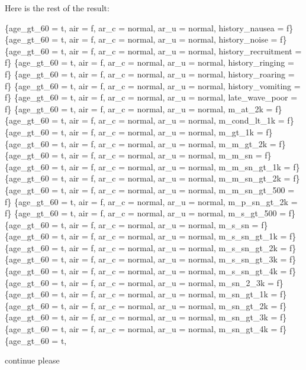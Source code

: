 \documentclass[12pt]{article}
\begin{document}
\begin{mdframed}
Here is the rest of the result:
\newline

    \{age\_gt\_60 = t, air = f, ar\_c = normal, ar\_u = normal, history\_nausea = f\}
    \{age\_gt\_60 = t, air = f, ar\_c = normal, ar\_u = normal, history\_noise = f\}
    \{age\_gt\_60 = t, air = f, ar\_c = normal, ar\_u = normal, history\_recruitment = f\}
    \{age\_gt\_60 = t, air = f, ar\_c = normal, ar\_u = normal, history\_ringing = f\}
    \{age\_gt\_60 = t, air = f, ar\_c = normal, ar\_u = normal, history\_roaring = f\}
    \{age\_gt\_60 = t, air = f, ar\_c = normal, ar\_u = normal, history\_vomiting = f\}
    \{age\_gt\_60 = t, air = f, ar\_c = normal, ar\_u = normal, late\_wave\_poor = f\}
    \{age\_gt\_60 = t, air = f, ar\_c = normal, ar\_u = normal, m\_at\_2k = f\}
    \{age\_gt\_60 = t, air = f, ar\_c = normal, ar\_u = normal, m\_cond\_lt\_1k = f\}
    \{age\_gt\_60 = t, air = f, ar\_c = normal, ar\_u = normal, m\_gt\_1k = f\}
    \{age\_gt\_60 = t, air = f, ar\_c = normal, ar\_u = normal, m\_m\_gt\_2k = f\}
    \{age\_gt\_60 = t, air = f, ar\_c = normal, ar\_u = normal, m\_m\_sn = f\}
    \{age\_gt\_60 = t, air = f, ar\_c = normal, ar\_u = normal, m\_m\_sn\_gt\_1k = f\}
    \{age\_gt\_60 = t, air = f, ar\_c = normal, ar\_u = normal, m\_m\_sn\_gt\_2k = f\}
    \{age\_gt\_60 = t, air = f, ar\_c = normal, ar\_u = normal, m\_m\_sn\_gt\_500 = f\}
    \{age\_gt\_60 = t, air = f, ar\_c = normal, ar\_u = normal, m\_p\_sn\_gt\_2k = f\}
    \{age\_gt\_60 = t, air = f, ar\_c = normal, ar\_u = normal, m\_s\_gt\_500 = f\}
    \{age\_gt\_60 = t, air = f, ar\_c = normal, ar\_u = normal, m\_s\_sn = f\}
    \{age\_gt\_60 = t, air = f, ar\_c = normal, ar\_u = normal, m\_s\_sn\_gt\_1k = f\}
    \{age\_gt\_60 = t, air = f, ar\_c = normal, ar\_u = normal, m\_s\_sn\_gt\_2k = f\}
    \{age\_gt\_60 = t, air = f, ar\_c = normal, ar\_u = normal, m\_s\_sn\_gt\_3k = f\}
    \{age\_gt\_60 = t, air = f, ar\_c = normal, ar\_u = normal, m\_s\_sn\_gt\_4k = f\}
    \{age\_gt\_60 = t, air = f, ar\_c = normal, ar\_u = normal, m\_sn\_2\_3k = f\}
    \{age\_gt\_60 = t, air = f, ar\_c = normal, ar\_u = normal, m\_sn\_gt\_1k = f\}
    \{age\_gt\_60 = t, air = f, ar\_c = normal, ar\_u = normal, m\_sn\_gt\_2k = f\}
    \{age\_gt\_60 = t, air = f, ar\_c = normal, ar\_u = normal, m\_sn\_gt\_3k = f\}
    \{age\_gt\_60 = t, air = f, ar\_c = normal, ar\_u = normal, m\_sn\_gt\_4k = f\}
    \{age\_gt\_60 = t,
\end{mdframed}

continue please
\end{document}
